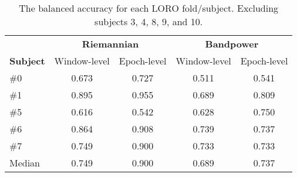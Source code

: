 \begin{table}[h]
    \centering
    \begin{tabular}{lcccc}
        \toprule
        & \multicolumn{2}{c}{\textbf{Riemannian}} & \multicolumn{2}{c}{\textbf{Bandpower}} \\
        \cmidrule(lr){2-3}
        \cmidrule(lr){4-5}
        \textbf{Subject} & Window-level & Epoch-level & Window-level & Epoch-level \\
        \midrule
        \#0 & 0.673 & 0.727 & 0.511 & 0.541 \\
        \#1 & 0.895 & 0.955 & 0.689 & 0.809 \\
        \#5 & 0.616 & 0.542 & 0.628 & 0.750 \\
        \#6 & 0.864 & 0.908 & 0.739 & 0.737 \\
        \#7 & 0.749 & 0.900 & 0.733 & 0.733 \\
        \midrule
        Median & 0.749 & 0.900 & 0.689 & 0.737 \\
        \bottomrule
    \end{tabular}
    \caption{The balanced accuracy for each LORO fold/subject. Excluding subjects 3, 4, 8, 9, and 10.}\label{table:bac-selective}
\end{table}
